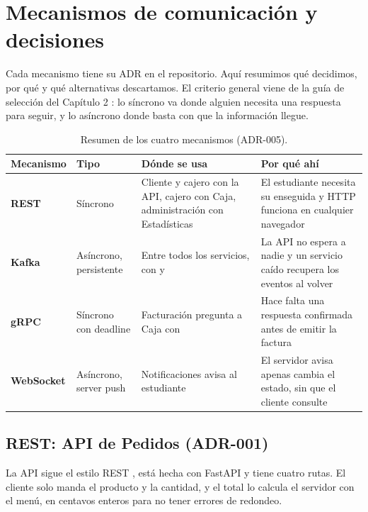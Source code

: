 \section{Mecanismos de comunicación y decisiones}

Cada mecanismo tiene su ADR en el repositorio. Aquí resumimos qué decidimos, por qué y qué alternativas descartamos. El criterio general viene de la guía de selección del Capítulo 2 \parencite{timbi2026comunicacion}: lo síncrono va donde alguien necesita una respuesta para seguir, y lo asíncrono donde basta con que la información llegue.

\begin{table}[H]
\centering
\small
\begin{tabularx}{\textwidth}{@{}l l Y Y@{}}
\toprule
\textbf{Mecanismo} & \textbf{Tipo} & \textbf{Dónde se usa} & \textbf{Por qué ahí} \\
\midrule
\textcolor{rest}{\textbf{REST}} & Síncrono & Cliente y cajero con la API, cajero con Caja, administración con Estadísticas & El estudiante necesita su  enseguida y HTTP funciona en cualquier navegador \\
\textcolor{kafka}{\textbf{Kafka}} & Asíncrono, persistente & Entre todos los servicios, con  y  & La API no espera a nadie y un servicio caído recupera los eventos al volver \\
\textcolor{grpc}{\textbf{gRPC}} & Síncrono con deadline & Facturación pregunta a Caja con  & Hace falta una respuesta confirmada antes de emitir la factura \\
\textcolor{ws}{\textbf{WebSocket}} & Asíncrono, server push & Notificaciones avisa al estudiante & El servidor avisa apenas cambia el estado, sin que el cliente consulte \\
\bottomrule
\end{tabularx}
\caption{Resumen de los cuatro mecanismos (ADR-005).}
\label{tab:mecanismos}
\end{table}

\subsection{REST: API de Pedidos (ADR-001)}

La API sigue el estilo REST \parencite{fielding2000architectural}, está hecha con FastAPI y tiene cuatro rutas. El cliente solo manda el producto y la cantidad, y el total lo calcula el servidor con el menú, en centavos enteros para no tener errores de redondeo.

